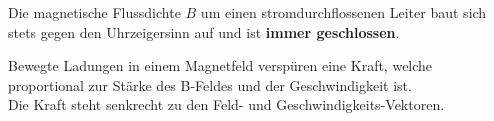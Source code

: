 	\beginip
	Die magnetische Flussdichte $B$ um einen stromdurchflossenen Leiter baut sich stets gegen den Uhrzeigersinn auf und ist \textbf{immer geschlossen}. \\
	\begin{center}
	\end{center}
	\iend

 \newpage
	\begingl
	Bewegte Ladungen in einem Magnetfeld verspüren eine Kraft, welche proportional zur Stärke des B-Feldes und der Geschwindigkeit ist. \\
	Die Kraft steht senkrecht zu den Feld- und Geschwindigkeits-Vektoren.


	\begin{center}
	\end{center}


